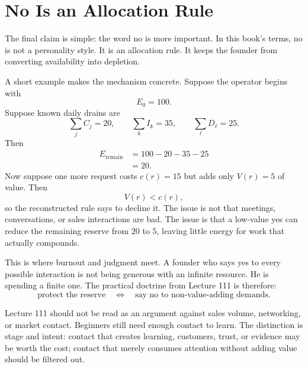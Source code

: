\documentclass[11pt,oneside]{book}
\begin{document}
\section{No Is an Allocation Rule}

The final claim is simple: the word no is more important. In this book's terms, no is not a personality style. It is an allocation rule. It keeps the founder from converting availability into depletion.

A short example makes the mechanism concrete. Suppose the operator begins with
\[
E_0=100.
\]
Suppose known daily drains are
\[
\sum_j C_j=20,
\qquad
\sum_k I_k=35,
\qquad
\sum_{\ell}D_{\ell}=25.
\]
Then
\begin{align}
E_{\mathrm{remain}}
&=
100-20-35-25\\
&=
20.
\end{align}
Now suppose one more request costs \(c(r)=15\) but adds only \(V(r)=5\) of value. Then
\[
V(r)<c(r),
\]
so the reconstructed rule says to decline it. The issue is not that meetings, conversations, or sales interactions are bad. The issue is that a low-value yes can reduce the remaining reserve from \(20\) to \(5\), leaving little energy for work that actually compounds.

This is where burnout and judgment meet. A founder who says yes to every possible interaction is not being generous with an infinite resource. He is spending a finite one. The practical doctrine from Lecture 111 is therefore:
\[
\text{protect the reserve}
\quad\Longleftrightarrow\quad
\text{say no to non-value-adding demands}.
\]

\begin{remark}
Lecture 111 should not be read as an argument against sales volume, networking, or market contact. Beginners still need enough contact to learn. The distinction is stage and intent: contact that creates learning, customers, trust, or evidence may be worth the cost; contact that merely consumes attention without adding value should be filtered out.
\end{remark}

\end{document}
